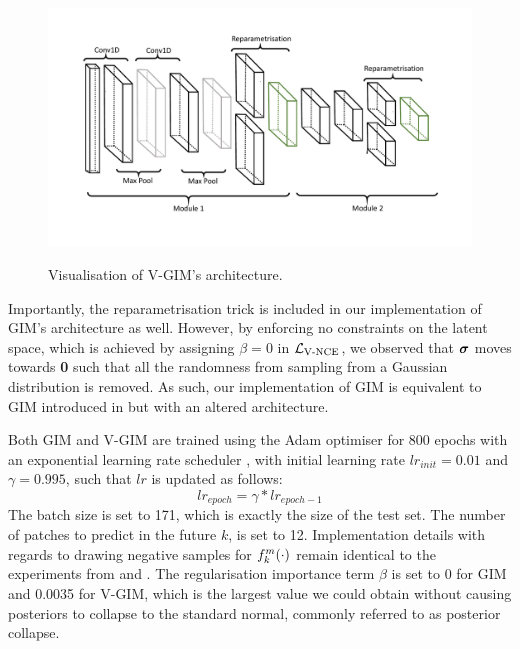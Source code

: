 		\begin{figure}
			\centering
			\hspace*{1.5cm}
			\begin{annotatedFigure}
				{\includegraphics[width=0.8\linewidth, trim={0 2.8cm 0 2cm}, clip]{"graphs/vgim architecture"} }
				
				
				
				
			\end{annotatedFigure}
			\caption{Visualisation of V-GIM's architecture.}
			\label{fig:architecture}
		\end{figure}
		
		
		Importantly, the reparametrisation trick is included in our implementation of GIM's architecture as well. However, by enforcing no constraints on the latent space, which is achieved by assigning $\beta = 0$ in $\mathcal{L}_{\text{V-NCE}}$, we observed that $\bm{\sigma}$ moves towards \textbf{0} such that all the randomness from sampling from a Gaussian distribution is removed. As such, our implementation of GIM is equivalent to GIM introduced in \citep{lowePuttingEndEndtoEnd2020a} but with an altered architecture.
		
		Both GIM and V-GIM are trained using the Adam optimiser for 800 epochs with an exponential learning rate scheduler \citep{bhargavladGuidePytorchLearning2020}, with initial learning rate $lr_{init} = 0.01$ and $\gamma=0.995$, such that $lr$ is updated as follows:
		$$lr_{epoch} = \gamma * lr_{epoch - 1}$$
		The batch size is set to 171, which is exactly the size of the test set. The number of patches to predict in the future $k$, is set to 12. Implementation details with regards to drawing negative samples for $f_k^m(\cdot)$ remain identical to the experiments from \citep{oordRepresentationLearningContrastive2019} and \citep{lowePuttingEndEndtoEnd2020a}. The regularisation importance term $\beta$ is set to 0 for GIM and 0.0035 for V-GIM, which is the largest value we could obtain without causing posteriors to collapse to the standard normal, commonly referred to as posterior collapse.


